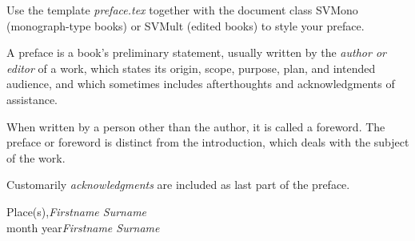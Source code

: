 %
%

\preface

Use the template \emph{preface.tex} together with the document class SVMono (monograph-type books) or SVMult (edited books) to style your preface.

A preface is a book's preliminary statement, usually written by the \textit{author or editor} of a work, which states its origin, scope, purpose, plan, and intended audience, and which sometimes includes afterthoughts and acknowledgments of assistance. 

When written by a person other than the author, it is called a foreword. The preface or foreword is distinct from the introduction, which deals with the subject of the work.

Customarily \textit{acknowledgments} are included as last part of the preface.
 

\vspace{\baselineskip}
\begin{flushright}\noindent
Place(s),\hfill {\it Firstname  Surname}\\
month year\hfill {\it Firstname  Surname}\\
\end{flushright}


